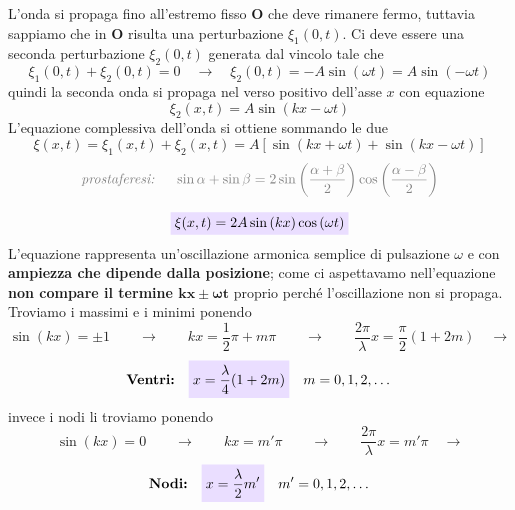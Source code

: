 \documentclass[x11names]{report}
\newcommand{\viola}[1]{\colorbox{yred}{$\displaystyle #1$}}
\begin{document}
	\vspace{0.2cm}
	
	L'onda si propaga fino all'estremo fisso \(\boldsymbol{O}\) che deve rimanere fermo, tuttavia sappiamo che in \(\boldsymbol{O}\) risulta una perturbazione \(\xi_1(0,t)\). Ci deve essere una seconda perturbazione \(\xi_2(0,t)\) generata dal vincolo tale che
	\[ 
	\xi _1(0,t) + \xi _2 (0,t) = 0 \quad \to \quad \xi _2 (0,t) = - A\sin\left(\omega t\right) = A\sin\left(-\omega t\right)
	\]
	quindi la seconda onda si propaga nel verso positivo dell'asse \(x\) con equazione
	\[ 
	\xi _2 (x,t) = A\sin\left(kx - \omega t\right)
	\]
	L'equazione complessiva dell'onda si ottiene sommando le due
	\[ 
	\xi(x,t) = \xi_1 (x,t) +  \xi _2 (x,t) = A\left[\sin\left(kx +\omega t\right)  + \sin\left(kx - \omega t\right)\right]
	\]
	\[
	\textcolor{gray}{\textit{prostaferesi: } \quad \sin\alpha + \sin\beta = 2\sin\left(\frac{\alpha + \beta}{2}\right)\cos\left(\frac{\alpha - \beta}{2}\right)}
	\]
	
	\begin{equation}
		\viola{\xi (x,t) = 2A\sin\left(kx\right)\cos\left(\omega t\right)}
	\end{equation}
	L'equazione rappresenta  un'oscillazione armonica semplice di pulsazione \(\omega \) e con \textbf{ampiezza che dipende dalla posizione}; come ci aspettavamo nell'equazione \textbf{non compare il termine \(\boldsymbol{kx \pm \omega t}\)} proprio perché l'oscillazione non si propaga. Troviamo i massimi e i minimi ponendo 
	\[ 
	\sin\left(kx\right) = \pm 1 \qquad \to \qquad kx = \frac{1}{2}\pi + m\pi \qquad \to \qquad \frac{2\pi }{\lambda}x = \frac{\pi }{2}(1 + 2m) \quad \to 
	\]
	\begin{equation}
		\textbf{Ventri:} \quad	\viola{x = \frac{\lambda}{4}(1+2m)} \quad m=0,1,2,\dots
	\end{equation}
	invece i nodi li troviamo ponendo 
	\[ 
	\sin\left(kx\right) = 0 \qquad \to \qquad kx =  m'\pi \qquad \to \qquad \frac{2\pi }{\lambda}x = m'\pi  \quad \to 
	\]
	\begin{equation}\label{nodi}
		\textbf{Nodi:} \quad	\viola{x = \frac{\lambda}{2} m'} \quad m'=0,1,2,\dots
	\end{equation}
	
\end{document}
